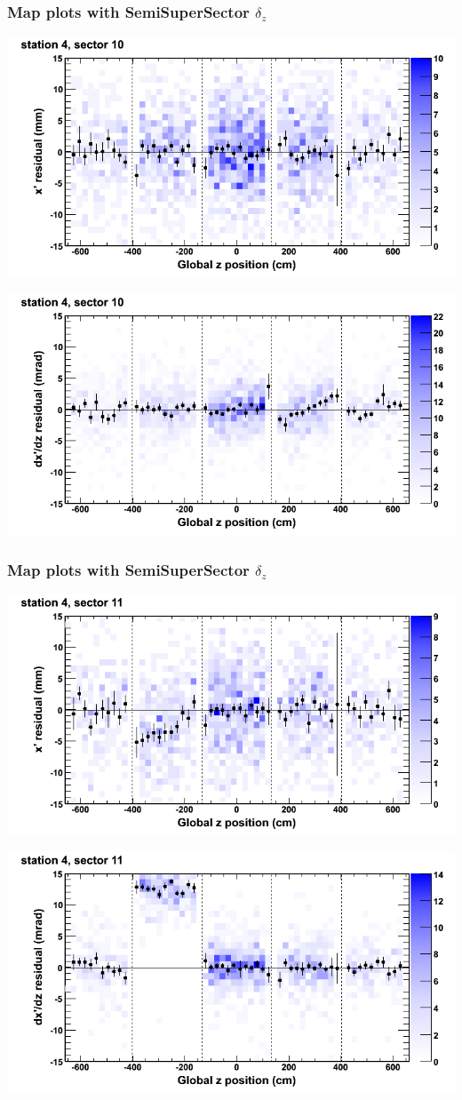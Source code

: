\documentclass[compress]{beamer}
\begin{document}
\begin{frame}
\frametitle{Map plots with SemiSuperSector $\delta_z$}
\includegraphics[width=0.5\linewidth]{zfit_mapplots/DTvsz_st4sec10_x.png}

\includegraphics[width=0.5\linewidth]{zfit_mapplots/DTvsz_st4sec10_dxdz.png}
\end{frame}

\begin{frame}
\frametitle{Map plots with SemiSuperSector $\delta_z$}
\includegraphics[width=0.5\linewidth]{zfit_mapplots/DTvsz_st4sec11_x.png}

\includegraphics[width=0.5\linewidth]{zfit_mapplots/DTvsz_st4sec11_dxdz.png}
\end{frame}
\end{document}
